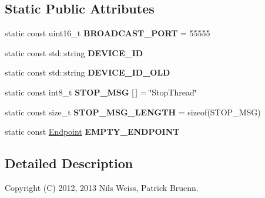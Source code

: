 \subsection*{Static Public Attributes}
\begin{DoxyCompactItemize}
\item 
\hypertarget{class_broadcast_receiver_a38d37ce60dc1fb1e0dbc08d80b5d3b47}{static const uint16\-\_\-t {\bfseries B\-R\-O\-A\-D\-C\-A\-S\-T\-\_\-\-P\-O\-R\-T} = 55555}\label{class_broadcast_receiver_a38d37ce60dc1fb1e0dbc08d80b5d3b47}

\item 
\hypertarget{class_broadcast_receiver_a7314a4107fc6e1c3d8dbace2b47c07d1}{static const std\-::string {\bfseries D\-E\-V\-I\-C\-E\-\_\-\-I\-D}}\label{class_broadcast_receiver_a7314a4107fc6e1c3d8dbace2b47c07d1}

\item 
\hypertarget{class_broadcast_receiver_addb5597142e98c3c16afce397082d960}{static const std\-::string {\bfseries D\-E\-V\-I\-C\-E\-\_\-\-I\-D\-\_\-\-O\-L\-D}}\label{class_broadcast_receiver_addb5597142e98c3c16afce397082d960}

\item 
\hypertarget{class_broadcast_receiver_a23ba740d80105d010f31eb35112c9775}{static const int8\-\_\-t {\bfseries S\-T\-O\-P\-\_\-\-M\-S\-G} \mbox{[}$\,$\mbox{]} = \char`\"{}Stop\-Thread\char`\"{}}\label{class_broadcast_receiver_a23ba740d80105d010f31eb35112c9775}

\item 
\hypertarget{class_broadcast_receiver_afa28d7c0a9058e830c7586e33acc6b69}{static const size\-\_\-t {\bfseries S\-T\-O\-P\-\_\-\-M\-S\-G\-\_\-\-L\-E\-N\-G\-T\-H} = sizeof(S\-T\-O\-P\-\_\-\-M\-S\-G)}\label{class_broadcast_receiver_afa28d7c0a9058e830c7586e33acc6b69}

\item 
\hypertarget{class_broadcast_receiver_a545fbd086416bfa77cd42b531d045a5b}{static const \hyperlink{class_endpoint}{Endpoint} {\bfseries E\-M\-P\-T\-Y\-\_\-\-E\-N\-D\-P\-O\-I\-N\-T}}\label{class_broadcast_receiver_a545fbd086416bfa77cd42b531d045a5b}

\end{DoxyCompactItemize}


\subsection{Detailed Description}
Copyright (C) 2012, 2013 Nils Weiss, Patrick Bruenn.

